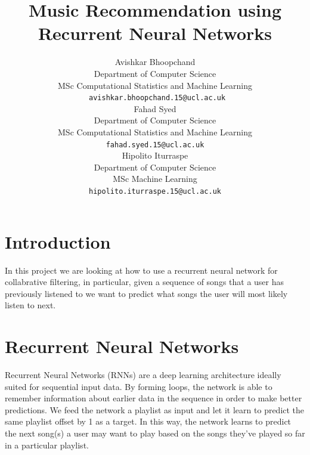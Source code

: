 \documentclass{article} %
\title{Music Recommendation using Recurrent Neural Networks}
\author{
Avishkar Bhoopchand\\
Department of Computer Science\\
MSc Computational Statistics and Machine Learning\\
\texttt{	avishkar.bhoopchand.15@ucl.ac.uk} \\
\And
Fahad Syed\\
Department of Computer Science\\
MSc Computational Statistics and Machine Learning\\
\texttt{fahad.syed.15@ucl.ac.uk} \\
\And
Hipolito Iturraspe\\
Department of Computer Science\\
MSc Machine Learning\\
\texttt{hipolito.iturraspe.15@ucl.ac.uk} \\
}
\begin{document}
\maketitle
\clearpage

\section{Introduction}
In this project we are looking at how to use a recurrent neural network for collabrative filtering, in particular, given a sequence of songs that a user has previously listened to we want to predict what songs the user will most likely listen to next.


%



\section{Recurrent Neural Networks}
Recurrent Neural Networks (RNNs) are a deep learning architecture ideally suited for sequential input data. By forming loops, the network is able to remember information about earlier data in the sequence in order to make better predictions. We feed the network a playlist as input and let it learn to predict the same playlist offset by 1 as a target. In this way, the network learns to predict the next song(s) a user may want to play based on the songs they've played so far in a particular playlist. \cite{LSTM}
\end{document}
